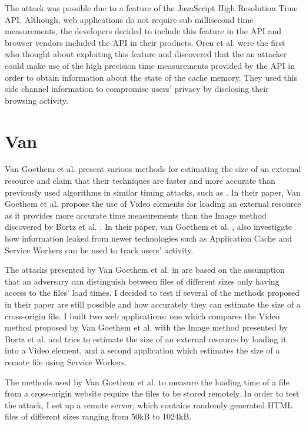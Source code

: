 \documentclass[10pt,a4paper,twoside]{book}
\begin{document}
The attack was possible due to a feature of the JavaScript High Resolution Time API. Although, web applications do not require sub millisecond time measurements, the developers decided to include this feature in the API and browser vendors included the API in their products. Oren et al. were the first who thought about exploiting this feature and discovered that the an attacker could make use of the high precision time measurements provided by the API in order to obtain information about the state of the cache memory. They used this side channel information to compromise users' privacy by disclosing their browsing activity.
 
\section{Van}
Van Goethem et al. \cite{van2015clock} present various methods for estimating the size of an external resource and claim that their techniques are faster and more accurate than previously used algorithms in similar timing attacks, such as \cite{bortz2007exposing}. In their paper, Van Goethem et al. \cite{van2015clock} propose the use of Video elements for loading an external resource as it provides more accurate time measurements than the Image method discovered by Bortz et al. \cite{bortz2007exposing}. In their paper, van Goethem et al. \cite{van2015clock}, also investigate how information leaked from newer technologies such as Application Cache and Service Workers can be used to track users' activity.

The attacks presented by Van Goethem et al. in \cite{van2015clock} are based on the assumption that an adversary can distinguish between files of different sizes only having access to the files' load times. I decided to test if several of the methods proposed in their paper are still possible and how accurately they can estimate the size of a cross-origin file. I built two web applications: one which compares the Video method proposed by Van Goethem et al. \cite{van2015clock} with the Image method presented by Bortz et al. \cite{bortz2007exposing} and tries to estimate the size of an external resource by loading it into a Video element, and a second application which estimates the size of a remote file using Service Workers.

The methods used by Van Goethem et al. \cite{van2015clock} to measure the loading time of a file from a cross-origin website require the files to be stored remotely. In order to test the attack, I set up a remote server, which contains randomly generated HTML files of different sizes ranging from 50kB to 1024kB. 
\end{document}
